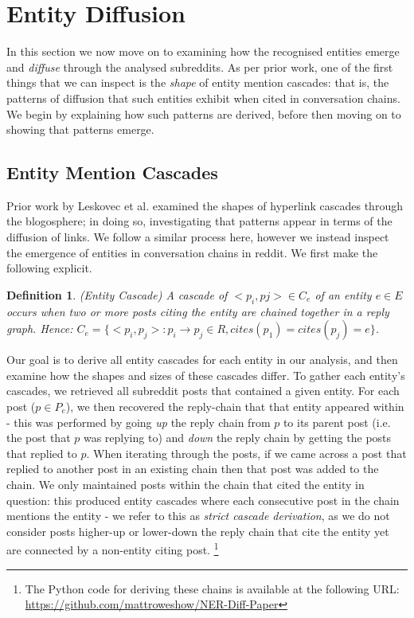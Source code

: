 \documentclass[journal,10pt,draftclsnofoot,onecolumn]{IEEEtran}
\newtheorem{mydef}{Definition}
\begin{document}
\clearpage
\section{Entity Diffusion}
In this section we now move on to examining how the recognised entities emerge and \emph{diffuse} through the analysed subreddits.
As per prior work, one of the first things that we can inspect is the \emph{shape} of entity mention cascades: that is, the patterns of diffusion that such entities exhibit when cited in conversation chains. 
We begin by explaining how such patterns are derived, before then moving on to showing that patterns emerge.

\subsection{Entity Mention Cascades}
Prior work by Leskovec et al. \cite{leskovec2007patterns} examined the shapes of hyperlink cascades through the blogosphere; in doing so, investigating that patterns appear in terms of the diffusion of links.
We follow a similar process here, however we instead inspect the emergence of entities in conversation chains in reddit.
We first make the following explicit.

\begin{mydef}
(Entity Cascade) A cascade of ${<p_i, pj>} \in C_e$ of an entity $e \in E$ occurs when two or more posts citing the entity are chained together in a reply graph. 
Hence: $C_e = \{<p_i, p_j> : p_i \rightarrow p_j \in R, cites(p_1) = cites(p_j) = e\}$.
\end{mydef}

Our goal is to derive all entity cascades for each entity in our analysis, and then examine how the shapes and sizes of these cascades differ.
To gather each entity's cascades, we retrieved all subreddit posts that contained a given entity.
For each post ($p \in P_e$), we then recovered the reply-chain that that entity appeared within - this was performed by going \emph{up} the reply chain from $p$ to its parent post (i.e. the post that $p$ was replying to) and \emph{down} the reply chain by getting the posts that replied to $p$.
When iterating through the posts, if we came across a post that replied to another post in an existing chain then that post was added to the chain.
We only maintained posts within the chain that cited the entity in question: this produced entity cascades where each consecutive post in the chain mentions the entity - we refer to this as \emph{strict cascade derivation}, as we do not consider posts higher-up or lower-down the reply chain that cite the entity yet are connected by a non-entity citing post. \footnote{The Python code for deriving these chains is available at the following URL: \url{https://github.com/mattroweshow/NER-Diff-Paper}}
\end{document}
